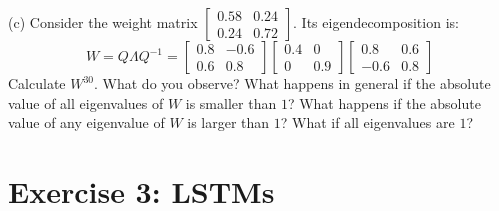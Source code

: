 \documentclass[12pt]{article}
\begin{document}
(c) Consider the weight matrix $\begin{bmatrix} 0.58 & 0.24 \\ 0.24 & 0.72 \end{bmatrix}$. Its eigendecomposition is:
\begin{equation*}
W = Q \Lambda Q^{-1} = \begin{bmatrix} 0.8 & -0.6 \\ 0.6 & 0.8 \end{bmatrix} \begin{bmatrix} 0.4 & 0 \\ 0 & 0.9 \end{bmatrix} \begin{bmatrix} 0.8 & 0.6 \\ -0.6 & 0.8 \end{bmatrix}
\end{equation*}
Calculate $W^{30}$. What do you observe? What happens in general if the absolute value of all eigenvalues of $W$ is smaller than $1$? What happens if the absolute value of any eigenvalue of $W$ is larger than $1$? What if all eigenvalues are $1$?

\section{\begingroup \large Exercise 3: LSTMs \endgroup}
 
\end{document}
